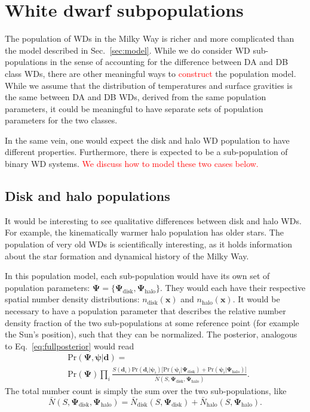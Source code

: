\documentclass[fleqn,usenatbib]{mnras}
\newcommand{\changes}[1]{\textcolor{red}{#1}}
\newcommand{\popp}{\boldsymbol{\Psi}}
\newcommand{\objp}{\boldsymbol{\psi}}
\newcommand{\data}{\mathbf{d}}
\newcommand{\pr}{\text{Pr}}
\begin{document}
\section{White dwarf subpopulations}\label{sec:subpopulations}

The population of WDs in the Milky Way is richer and more complicated than the model described in Sec.~\ref{sec:model}. While we do consider WD sub-populations in the sense of accounting for the difference between DA and DB class WDs, there are other meaningful ways to \changes{construct} the population model. While we assume that the distribution of temperatures and surface gravities is the same between DA and DB WDs, derived from the same population parameters, it could be meaningful to have separate sets of population parameters for the two classes.

In the same vein, one would expect the disk and halo WD population to have different properties. Furthermore, there is expected to be a sub-population of binary WD systems. \changes{We discuss how to model these two cases below.}



\subsection{Disk and halo populations}

It would be interesting to see qualitative differences between disk and halo WDs. For example, the kinematically warmer halo population has older stars. The population of very old WDs is scientifically interesting, as it holds information about the star formation and dynamical history of the Milky Way.

In this population model, each sub-population would have its own set of population parameters: $\popp = \{ \popp_\text{disk},\popp_\text{halo} \}$. They would each have their respective spatial number density distributions: $n_\text{disk}(\mathbf{x})$ and $n_\text{halo}(\mathbf{x})$. It would be necessary to have a population parameter that describes the relative number density fraction of the two sub-populations at some reference point (for example the Sun's position), such that they can be normalized. The posterior, analogous to Eq.~\eqref{eq:fullposterior} would read
\begin{equation}\label{eq:posterior_disk_halo}
\begin{split}
	& \pr(\popp,\objp | \data ) = \\
	& \pr(\popp)
	\prod_i 
	\frac{S(\data_i) \pr(\data_i | \objp_i)
	\Big[ \pr(\objp_i | \popp_\text{disk})+\pr(\objp_i | \popp_\text{halo}) \Big] }
	{\bar{N}(S,\popp_\text{disk},\popp_\text{halo})}.
\end{split}
\end{equation}
The total number count is simply the sum over the two sub-populations, like
\begin{equation}
	\bar{N}(S,\popp_\text{disk},\popp_\text{halo})=\bar{N}_\text{disk}(S,\popp_\text{disk})+\bar{N}_\text{halo}(S,\popp_\text{halo}).
\end{equation}
\end{document}
